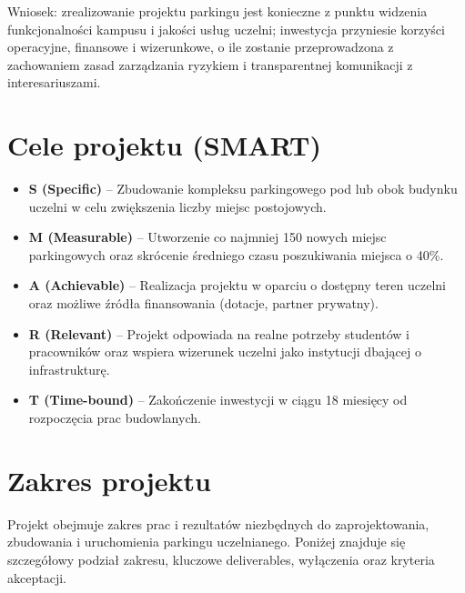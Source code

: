 \documentclass[a4paper,12pt]{article}
\begin{document}
Wniosek: zrealizowanie projektu parkingu jest konieczne z punktu widzenia funkcjonalności kampusu i jakości usług uczelni; inwestycja przyniesie korzyści operacyjne, finansowe i wizerunkowe, o ile zostanie przeprowadzona z zachowaniem zasad zarządzania ryzykiem i transparentnej komunikacji z interesariuszami.

\section{Cele projektu (SMART)}
\begin{itemize}
    \item \textbf{S (Specific)} – Zbudowanie kompleksu parkingowego pod lub obok budynku uczelni w celu zwiększenia liczby miejsc postojowych.
    \item \textbf{M (Measurable)} – Utworzenie co najmniej 150 nowych miejsc parkingowych oraz skrócenie średniego czasu poszukiwania miejsca o 40\%.
    \item \textbf{A (Achievable)} – Realizacja projektu w oparciu o dostępny teren uczelni oraz możliwe źródła finansowania (dotacje, partner prywatny).
    \item \textbf{R (Relevant)} – Projekt odpowiada na realne potrzeby studentów i pracowników oraz wspiera wizerunek uczelni jako instytucji dbającej o infrastrukturę.
    \item \textbf{T (Time-bound)} – Zakończenie inwestycji w ciągu 18 miesięcy od rozpoczęcia prac budowlanych.
\end{itemize}

\section{Zakres projektu}
Projekt obejmuje zakres prac i rezultatów niezbędnych do zaprojektowania, zbudowania i uruchomienia parkingu uczelnianego. Poniżej znajduje się szczegółowy podział zakresu, kluczowe deliverables, wyłączenia oraz kryteria akceptacji.
\end{document}
